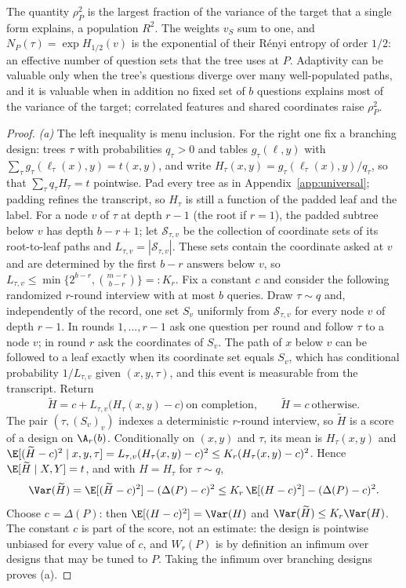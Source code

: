 The quantity $\rho_P^2$ is the largest fraction of the variance of the target
that a single form explains, a population $R^2$. The weights $v_S$ sum to
one, and $N_P(\tau)=\exp H_{1/2}(v)$ is the exponential of their R\'enyi
entropy of order $1/2$: an effective number of question sets that the tree
uses at $P$. Adaptivity can be valuable only when the tree's questions diverge
over many well-populated paths, and it is valuable when in addition no fixed
set of $b$ questions explains most of the variance of the target; correlated
features and shared coordinates raise $\rho_P^2$.

\begin{proof}
\emph{(a)} The left inequality is menu inclusion. For the right one fix a
branching design: trees $\tau$ with probabilities $q_\tau>0$ and tables
$g_\tau(\ell,y)$ with $\sum_\tau g_\tau(\ell_\tau(x),y)=t(x,y)$, and write
$H_\tau(x,y)=g_\tau(\ell_\tau(x),y)/q_\tau$, so that
$\sum_\tau q_\tau H_\tau=t$ pointwise. Pad every tree as in
Appendix~\ref{app:universal}; padding refines the transcript, so $H_\tau$
is still a function of the padded leaf and the label. For a node $v$ of
$\tau$ at depth $r-1$ (the root if $r=1$), the padded subtree below $v$ has
depth $b-r+1$; let $\mathcal S_{\tau,v}$ be the collection of coordinate sets
of its root-to-leaf paths and $L_{\tau,v}=|\mathcal S_{\tau,v}|$. These sets
contain the coordinate asked at $v$ and are determined by the first $b-r$
answers below $v$, so $L_{\tau,v}\le\min\{2^{b-r},\binom{m-r}{b-r}\}=:K_r$.
Fix a constant $c$ and consider the following randomized $r$-round interview
with at most $b$ queries. Draw $\tau\sim q$ and, independently of the record,
one set $S_v$ uniformly from $\mathcal S_{\tau,v}$ for every node $v$ of
depth $r-1$. In rounds $1,\ldots,r-1$ ask one question per round and follow
$\tau$ to a node $v$; in round $r$ ask the coordinates of $S_v$. The path of
$x$ below $v$ can be followed to a leaf exactly when its coordinate set equals
$S_v$, which has conditional probability $1/L_{\tau,v}$ given $(x,y,\tau)$,
and this event is measurable from the transcript. Return
\[
 \widetilde H=c+L_{\tau,v}\big(H_\tau(x,y)-c\big)\ \text{on completion},\qquad \widetilde H=c\ \text{otherwise}.
\]
The pair $(\tau,(S_v)_v)$ indexes a deterministic $r$-round interview, so
$\widetilde H$ is a score of a design on $\A_r(b)$. Conditionally on $(x,y)$
and $\tau$, its mean is $H_\tau(x,y)$ and
$\E[(\widetilde H-c)^2\mid x,y,\tau]=L_{\tau,v}(H_\tau(x,y)-c)^2\le K_r(H_\tau(x,y)-c)^2$.
Hence $\E[\widetilde H\mid X,Y]=t$, and with $H=H_\tau$ for $\tau\sim q$,
\[
 \Var(\widetilde H)=\E[(\widetilde H-c)^2]-(\Delta(P)-c)^2
 \le K_r\,\E[(H-c)^2]-(\Delta(P)-c)^2 .
\]
Choose $c=\Delta(P)$: then $\E[(H-c)^2]=\Var(H)$ and
$\Var(\widetilde H)\le K_r\Var(H)$. The constant $c$ is part of the score, not
an estimate: the design is pointwise unbiased for every value of $c$, and
$W_r(P)$ is by definition an infimum over designs that may be tuned to $P$.
Taking the infimum over branching designs proves (a).


\end{proof}
